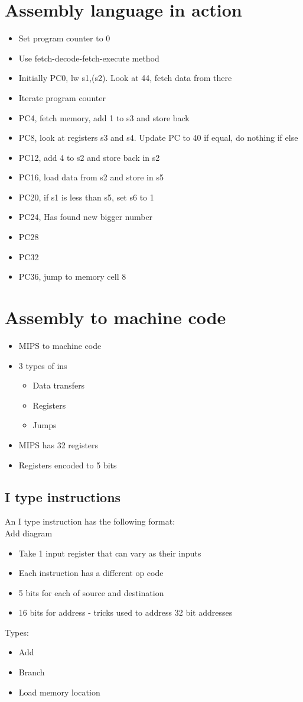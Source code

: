 \documentclass{article}[18pt]
\begin{document}
\section{Assembly language in action}
\begin{itemize}
\item Set program counter to 0
\item Use fetch-decode-fetch-execute method
\item Initially PC0, lw s1,(s2). Look at 44, fetch data from there
\item Iterate program counter
\item PC4, fetch memory, add 1 to s3 and store back
\item PC8, look at registers s3 and s4. Update PC to 40 if equal, do nothing if else
\item PC12, add 4 to s2 and store back in s2
\item PC16, load data from s2 and store in s5
\item PC20, if s1 is less than s5, set s6 to 1
\item PC24, Has found new bigger number
\item PC28
\item PC32
\item PC36, jump to memory cell 8
\end{itemize}
\section{Assembly to machine code}
\begin{itemize}
\item MIPS to machine code
\item 3 types of ins
\begin{itemize}
\item Data transfers
\item Registers
\item Jumps
\end{itemize}
\item MIPS has 32 registers
\item Registers encoded to 5 bits
\end{itemize}
\subsection{I type instructions}
An I type instruction has the following format:\\
Add diagram\\
\begin{itemize}
\item Take 1 input register that can vary as their inputs
\item Each instruction has a different op code
\item 5 bits for each of source and destination
\item 16 bits for address - tricks used to address 32 bit addresses
\end{itemize}
Types:
\begin{itemize}
\item Add
\item Branch
\item Load memory location
\end{itemize}
\end{document}
